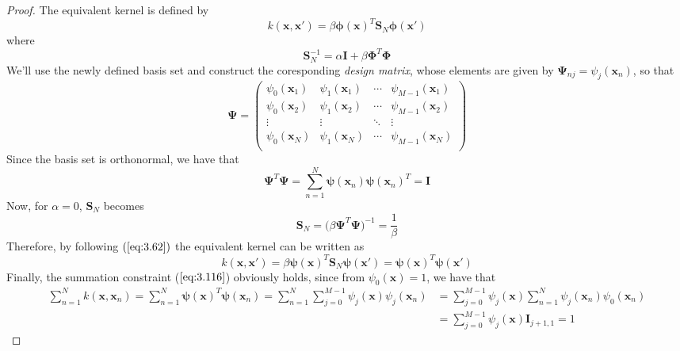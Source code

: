 \begin{proof}
    The equivalent kernel is defined by
    \begin{equation*}
        k(\mathbf{x}, \mathbf{x'}) 
        = \beta \bm{\phi}(\mathbf{x})^T\mathbf{S}_N\bm{\phi}(\mathbf{x}')
        \tag{3.62}\label{eq:3.62}
    \end{equation*}
    where 
    \begin{equation*}
        \mathbf{S}_N^{-1} = \alpha\mathbf{I} + \beta\mathbf{\Phi}^T\mathbf{\Phi}
        \tag{3.54}\label{eq:3.54}
    \end{equation*}
    We'll use the newly defined basis set and
    construct the coresponding \emph{design matrix},
    whose elements are given by $\mathbf{\Psi}_{nj} = \psi_j({\mathbf{x}_n})$,
    so that
    \[
        \mathbf{\Psi} =
        \begin{pmatrix}
            \psi_0(\mathbf{x}_1) & \psi_1(\mathbf{x}_1) & \cdots & \psi_{M - 1}(\mathbf{x}_1) \\
            \psi_0(\mathbf{x}_2) & \psi_1(\mathbf{x}_2) & \cdots & \psi_{M - 1}(\mathbf{x}_2) \\
            \vdots & \vdots & \ddots & \vdots \\
            \psi_0(\mathbf{x}_N) & \psi_1(\mathbf{x}_N) & \cdots & \psi_{M - 1}(\mathbf{x}_N) \\
        \end{pmatrix}
    \] 
    Since the basis set is orthonormal, we have that
     \[
         \mathbf{\Psi}^T \mathbf{\Psi} 
         = \sum_{n=1}^{N} \bm{\psi}(\mathbf{x}_n) \bm{\psi}(\mathbf{x}_n)^T 
         = \mathbf{I}
    \] 
    Now, for $\alpha = 0$, $\mathbf{S}_N$ becomes 
    \[
        \mathbf{S}_N = \big(\beta \mathbf{\Psi}^T \mathbf{\Psi}\big)^{-1} = \frac{1}{\beta}
    \] 
    Therefore, by following $(\ref{eq:3.62})$ the equivalent kernel can be written as
    \[
        k(\mathbf{x}, \mathbf{x'}) 
        = \beta \bm{\psi}(\mathbf{x})^T \mathbf{S}_N \bm{\psi}(\mathbf{x'})
        = \bm{\psi}(\mathbf{x})^T \bm{\psi}(\mathbf{x'})
    \] 
    Finally, the summation constraint ($\ref{eq:3.116}$) obviously holds, since
    from $\psi_0(\mathbf{x}) = 1$, we have that
    \begin{align*}
        \sum_{n=1}^{N} k(\mathbf{x}, \mathbf{x}_n) 
        = \sum_{n=1}^{N} \bm{\psi}(\mathbf{x})^T \bm{\psi}(\mathbf{x}_n)
        = \sum_{n=1}^{N} \sum_{j=0}^{M - 1} \psi_j(\mathbf{x}) \psi_j(\mathbf{x}_n)  
        &= \sum_{j=0}^{M - 1} \psi_j(\mathbf{x}) 
        \sum_{n=1}^{N} \psi_j(\mathbf{x}_n) \psi_0(\mathbf{x}_n) \\
        &= \sum_{j=0}^{M - 1} \psi_j(\mathbf{x}) \mathbf{I}_{j+1, 1} = 1
    \end{align*}
\end{proof}


